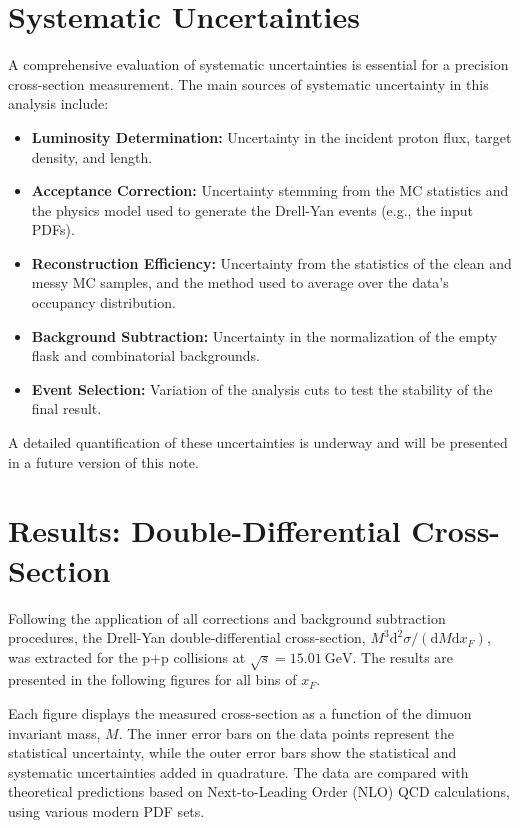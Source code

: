 \documentclass[11pt]{article}
\newcommand{\diffd}{\mathrm{d}}
\begin{document}
\FloatBarrier

\section{Systematic Uncertainties}
\label{sec:systematics}
A comprehensive evaluation of systematic uncertainties is essential for a precision cross-section measurement. The main sources of systematic uncertainty in this analysis include:
\begin{itemize}
    \item \textbf{Luminosity Determination:} Uncertainty in the incident proton flux, target density, and length.
    \item \textbf{Acceptance Correction:} Uncertainty stemming from the MC statistics and the physics model used to generate the Drell-Yan events (e.g., the input PDFs).
    \item \textbf{Reconstruction Efficiency:} Uncertainty from the statistics of the clean and messy MC samples, and the method used to average over the data's occupancy distribution.
    \item \textbf{Background Subtraction:} Uncertainty in the normalization of the empty flask and combinatorial backgrounds.
    \item \textbf{Event Selection:} Variation of the analysis cuts to test the stability of the final result.
\end{itemize}
A detailed quantification of these uncertainties is underway and will be presented in a future version of this note.

\section{Results: Double-Differential Cross-Section}
\label{sec:results}
Following the application of all corrections and background subtraction procedures, the Drell-Yan double-differential cross-section, $M^3 \diffd^2\sigma / (\diffd M \diffd x_F)$, was extracted for the p+p collisions at $\sqrt{s} = \SI{15.01}{\giga\electronvolt}$. The results are presented in the following figures for all bins of $x_F$.

Each figure displays the measured cross-section as a function of the dimuon invariant mass, $M$. The inner error bars on the data points represent the statistical uncertainty, while the outer error bars show the statistical and systematic uncertainties added in quadrature. The data are compared with theoretical predictions based on Next-to-Leading Order (NLO) QCD calculations, using various modern PDF sets.
\end{document}
